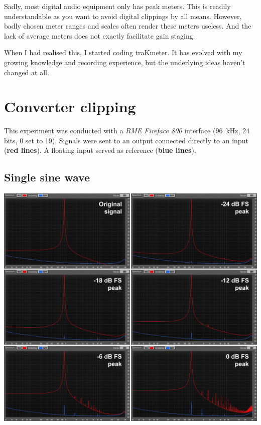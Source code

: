 Sadly, most digital audio equipment only has peak meters.  This is
readily understandable as you want to avoid digital clippings by all
means.  However, badly chosen meter ranges and scales often render
these meters useless.  And the lack of average meters does not exactly
facilitate gain staging.

When I had realised this, I started coding traKmeter.  It has evolved
with my growing knowledge and recording experience, but the underlying
ideas haven't changed at all.

\section{Converter clipping}
\label{sec:converter_clipping}

This experiment was conducted with a \emph{RME Fireface 800} interface
(\SI{96}{\kilo\hertz}, 24 bits, \SI{0}{\dBFS} set to
\SI[retain-explicit-plus]{+19}{\dBu}).  Signals were sent to an output
connected directly to an input (\textbf{red lines}).  A floating input
served as reference (\textbf{blue lines}).

\subsection{Single sine wave}

\includegraphics[scale=0.19,clip]{include/images/clipping_sine_ff800.png}

